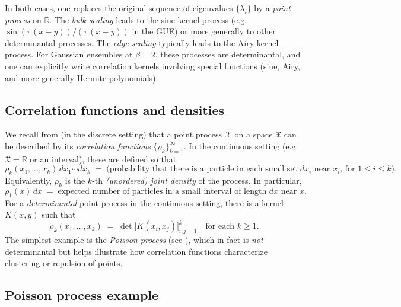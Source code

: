\documentclass[letterpaper,11pt,oneside,reqno]{article}
\numberwithin{equation}{section}
\theoremstyle{definition}
\begin{document}
In both cases, one replaces the original sequence of eigenvalues \(\{\lambda_i\}\) by
a \emph{point process} on \(\mathbb{R}\).  The \emph{bulk scaling} leads to the sine-kernel process (e.g.\ \(\sin(\pi(x-y))/(\pi(x-y))\) in the GUE) or more generally to other determinantal processes.
The \emph{edge scaling} typically leads to the Airy-kernel process.
For Gaussian ensembles at \(\beta=2\), these processes are determinantal, and one can explicitly
write correlation kernels involving special functions (sine, Airy, and more generally Hermite polynomials).

\subsection{Correlation functions and densities}
\label{subsec:correlation-functions}

We recall from  (in the discrete setting) that a point process \(\mathcal{X}\) on a space \(\mathfrak{X}\) can be described by its \emph{correlation functions} \(\{\rho_k\}_{k=1}^\infty\). In the continuous setting (e.g.\ \(\mathfrak{X}=\mathbb{R}\) or an interval), these are defined so that
\begin{equation}
  \rho_k(x_1,\dots,x_k)\,dx_1\cdots dx_k
  \;=\;
  \text{(probability that there is a particle in each small set $dx_i$ near $x_i$, for $1\le i\le k$)}.
\end{equation}
Equivalently, \(\rho_k\) is the \(k\)-th \emph{(unordered) joint density} of the process.  In particular,
\[
  \rho_1(x)\,dx
  \;=\;
  \text{expected number of particles in a small interval of length $dx$ near $x$.}
\]
For a \emph{determinantal} point process in the continuous setting, there is a kernel \(K(x,y)\) such that
\begin{equation}
  \label{eq:rho-k-dpp-cont}
  \rho_k(x_1,\dots,x_k)
  \;=\;
  \det\bigl[K(x_i,x_j)\bigr]_{i,j=1}^k
  \quad
  \text{for each $k\ge1$}.
\end{equation}
The simplest example is the \emph{Poisson process} (see ), which in fact is \emph{not} determinantal but helps illustrate how correlation functions characterize clustering or repulsion of points.

\subsection{Poisson process example}
\label{subsec:poisson-example}
\end{document}
